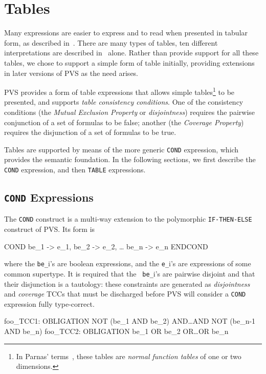 
\section{Tables}

Many expressions are easier to express and to read when presented in
tabular form, as described in~\cite{Heitmeyer94:SCR-checks,Parnas92}.
There are many types of tables, ten different interpretations are
described in~\cite{Parnas92} alone.  Rather than provide support for all
these tables, we chose to support a simple form of table initially,
providing extensions in later versions of PVS as the need arises.

PVS provides a form of table expressions that allows simple
tables\footnote{In Parnas' terms~\cite{Parnas92}, these tables are
\emph{normal function tables} of one or two dimensions.} to be presented,
and supports \emph{table consistency conditions}.
One of the consistency conditions (the \emph{Mutual Exclusion
Property} or
\emph{disjointness}) requires the pairwise
conjunction of a set of formulas to be false; another (the \emph{Coverage
Property}) requires the disjunction of a set of
formulas to be true.

Tables are supported by means of the more generic \texttt{COND}
expression, which provides the semantic foundation.  In the following
sections, we first describe the \texttt{COND} expression, and then
\texttt{TABLE} expressions.

\subsection{\texttt{COND} Expressions}

The {\tt COND} construct is a multi-way extension to the polymorphic
{\tt IF-THEN-ELSE} construct of PVS\@.  Its form is
\begin{pvsex}
  COND
      be\_1 -> e\_1,
      be\_2 -> e\_2,
        \ldots
      be\_n -> e\_n
  ENDCOND
\end{pvsex}
where the {\tt be\_}i's are boolean expressions, and the {\tt e\_}i's are
expressions of some common supertype.  It is required that the {\tt
be\_}i's are pairwise disjoint and that their disjunction is a tautology:
these constraints are generated as \emph{disjointness} and \emph{coverage} TCCs that must be discharged before PVS will
consider a {\tt COND} expression fully type-correct.
\begin{pvsex}
  foo_TCC1: OBLIGATION NOT (be\_1 AND be\_2) AND\ldots{}AND NOT (be\_n-1 AND be\_n)
  foo_TCC2: OBLIGATION be\_1 OR be\_2 OR\ldots{}OR be\_n
\end{pvsex}

